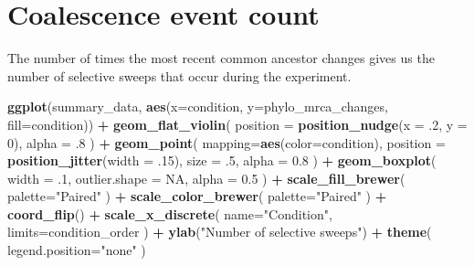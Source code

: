 \documentclass[]{book}
\newenvironment{Shaded}{\begin{snugshade}}{\end{snugshade}}
\newcommand{\DataTypeTok}[1]{\textcolor[rgb]{0.13,0.29,0.53}{#1}}
\newcommand{\DecValTok}[1]{\textcolor[rgb]{0.00,0.00,0.81}{#1}}
\newcommand{\FloatTok}[1]{\textcolor[rgb]{0.00,0.00,0.81}{#1}}
\newcommand{\KeywordTok}[1]{\textcolor[rgb]{0.13,0.29,0.53}{\textbf{#1}}}
\newcommand{\NormalTok}[1]{#1}
\newcommand{\OperatorTok}[1]{\textcolor[rgb]{0.81,0.36,0.00}{\textbf{#1}}}
\newcommand{\OtherTok}[1]{\textcolor[rgb]{0.56,0.35,0.01}{#1}}
\newcommand{\StringTok}[1]{\textcolor[rgb]{0.31,0.60,0.02}{#1}}
\begin{document}
\hypertarget{coalescence-event-count-1}{%
\section{Coalescence event count}\label{coalescence-event-count-1}}

The number of times the most recent common ancestor changes gives us the number of selective sweeps that occur during the experiment.

\begin{Shaded}
\begin{Highlighting}[]
\KeywordTok{ggplot}\NormalTok{(summary_data, }\KeywordTok{aes}\NormalTok{(}\DataTypeTok{x=}\NormalTok{condition, }\DataTypeTok{y=}\NormalTok{phylo_mrca_changes, }\DataTypeTok{fill=}\NormalTok{condition)) }\OperatorTok{+}
\StringTok{  }\KeywordTok{geom_flat_violin}\NormalTok{(}
    \DataTypeTok{position =} \KeywordTok{position_nudge}\NormalTok{(}\DataTypeTok{x =} \FloatTok{.2}\NormalTok{, }\DataTypeTok{y =} \DecValTok{0}\NormalTok{),}
    \DataTypeTok{alpha =} \FloatTok{.8}
\NormalTok{  ) }\OperatorTok{+}
\StringTok{  }\KeywordTok{geom_point}\NormalTok{(}
    \DataTypeTok{mapping=}\KeywordTok{aes}\NormalTok{(}\DataTypeTok{color=}\NormalTok{condition),}
    \DataTypeTok{position =} \KeywordTok{position_jitter}\NormalTok{(}\DataTypeTok{width =} \FloatTok{.15}\NormalTok{),}
    \DataTypeTok{size =} \FloatTok{.5}\NormalTok{,}
    \DataTypeTok{alpha =} \FloatTok{0.8}
\NormalTok{  ) }\OperatorTok{+}
\StringTok{  }\KeywordTok{geom_boxplot}\NormalTok{(}
    \DataTypeTok{width =} \FloatTok{.1}\NormalTok{,}
    \DataTypeTok{outlier.shape =} \OtherTok{NA}\NormalTok{,}
    \DataTypeTok{alpha =} \FloatTok{0.5}
\NormalTok{  ) }\OperatorTok{+}
\StringTok{  }\KeywordTok{scale_fill_brewer}\NormalTok{(}
    \DataTypeTok{palette=}\StringTok{"Paired"}
\NormalTok{  ) }\OperatorTok{+}
\StringTok{  }\KeywordTok{scale_color_brewer}\NormalTok{(}
    \DataTypeTok{palette=}\StringTok{"Paired"}
\NormalTok{  ) }\OperatorTok{+}
\StringTok{  }\KeywordTok{coord_flip}\NormalTok{() }\OperatorTok{+}
\StringTok{  }\KeywordTok{scale_x_discrete}\NormalTok{(}
    \DataTypeTok{name=}\StringTok{"Condition"}\NormalTok{,}
    \DataTypeTok{limits=}\NormalTok{condition_order}
\NormalTok{  ) }\OperatorTok{+}
\StringTok{  }\KeywordTok{ylab}\NormalTok{(}\StringTok{"Number of selective sweeps"}\NormalTok{) }\OperatorTok{+}
\StringTok{  }\KeywordTok{theme}\NormalTok{(}
    \DataTypeTok{legend.position=}\StringTok{"none"}
\NormalTok{  )}
\end{Highlighting}
\end{Shaded}
\end{document}
